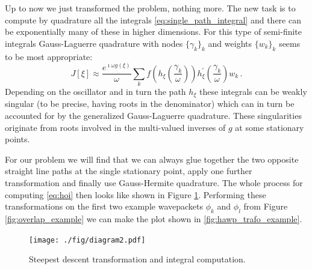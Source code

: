 \documentclass[a4paper,10pt]{article}
\begin{document}
Up to now we just transformed the problem, nothing more. The new task is to
compute by quadrature all the integrals \eqref{eq:single_path_integral} and
there can be exponentially many of these in higher dimensions. For this type of
semi-finite integrals Gauss-Laguerre quadrature with nodes $\{\gamma_k\}_{k}$
and weights $\{w_k\}_{k}$ seems to be most appropriate:
\begin{equation}
  J[\xi] \approx \frac{e^{\imath \omega g(\xi)}}{\omega}
                 \sum_{k}
                   f\left(h_{\xi}\left(\frac{\gamma_k}{\omega}\right)\right)
                   h_{\xi}^{\prime}\left(\frac{\gamma_k}{\omega}\right)
                   w_k \,.
\end{equation}
Depending on the oscillator and in turn the path $h_{\xi}$ these integrals can be
weakly singular (to be precise, having roots in the denominator) which can in turn
be accounted for by the generalized Gauss-Laguerre quadrature. These singularities
originate from roots involved in the multi-valued inverses of $g$ at some stationary
points.

For our problem we will find that we can always glue together the two opposite
straight line paths at the single stationary point, apply one further transformation and
finally use Gauss-Hermite quadrature. The whole process for computing \eqref{eq:hoi}
then looks like shown in Figure \ref{fig:transformation_chain_2}. Performing these
transformations on the first two example wavepackets $\phi_k$ and $\phi_l$ from Figure
\ref{fig:overlap_example} we can make the plot shown in \ref{fig:hawp_trafo_example}.

\begin{figure}
  \centering
  \texttt{[image: ./fig/diagram2.pdf]}
  \caption{Steepest descent transformation and integral computation.}
  \label{fig:transformation_chain_2}
\end{figure}
\end{document}
